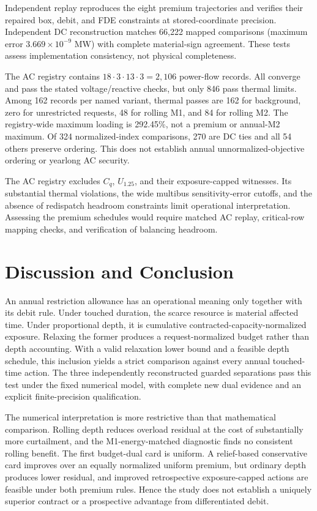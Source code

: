 \documentclass[10pt,journal]{IEEEtran}
\begin{document}
Independent replay reproduces the eight premium trajectories and verifies their repaired box, debit, and FDE constraints at stored-coordinate precision. Independent DC reconstruction matches 66,222 mapped comparisons (maximum error $3.669\times10^{-9}$ MW) with complete material-sign agreement. These tests assess implementation consistency, not physical completeness.

The AC registry contains $18\cdot3\cdot13\cdot3=2{,}106$ power-flow records. All converge and pass the stated voltage/reactive checks, but only 846 pass thermal limits. Among 162 records per named variant, thermal passes are 162 for background, zero for unrestricted requests, 48 for rolling M1, and 84 for rolling M2. The registry-wide maximum loading is 292.45\%, not a premium or annual-M2 maximum. Of 324 normalized-index comparisons, 270 are DC ties and all 54 others preserve ordering. This does not establish annual unnormalized-objective ordering or yearlong AC security.

The AC registry excludes $C_q$, $U_{1.25}$, and their exposure-capped witnesses. Its substantial thermal violations, the wide multibus sensitivity-error cutoffs, and the absence of redispatch headroom constraints limit operational interpretation. Assessing the premium schedules would require matched AC replay, critical-row mapping checks, and verification of balancing headroom.


\section{Discussion and Conclusion}
\label{sec:conclusion}
An annual restriction allowance has an operational meaning only together with its debit rule. Under touched duration, the scarce resource is material affected time. Under proportional depth, it is cumulative contracted-capacity-normalized exposure. Relaxing the former produces a request-normalized budget rather than depth accounting. With a valid relaxation lower bound and a feasible depth schedule, this inclusion yields a strict comparison against every annual touched-time action. The three independently reconstructed guarded separations pass this test under the fixed numerical model, with complete new dual evidence and an explicit finite-precision qualification.

The numerical interpretation is more restrictive than that mathematical comparison. Rolling depth reduces overload residual at the cost of substantially more curtailment, and the M1-energy-matched diagnostic finds no consistent rolling benefit. The first budget-dual card is uniform. A relief-based conservative card improves over an equally normalized uniform premium, but ordinary depth produces lower residual, and improved retrospective exposure-capped actions are feasible under both premium rules. Hence the study does not establish a uniquely superior contract or a prospective advantage from differentiated debit.
\end{document}
